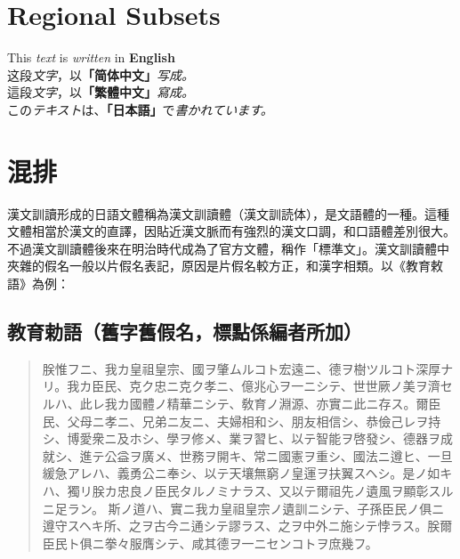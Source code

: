 \documentclass{report}
\begin{document}
\newpage
\section{Regional Subsets}
 {This \textit{text} is \textit{written} in \textbf{English}\\}
 {这段\textit{文字}，以\textbf{「简体中文」}\textit{写成。}\\}
 {\hant 這段\textit{文字}，以\textbf{「繁體中文」}\textit{寫成。}\\}
 {\ja この\textit{テキスト}は、\textbf{「日本語」}で\textit{書かれています。}}
\section{混排}
漢文訓讀形成的日語文體稱為漢文訓讀體{\ja（漢文訓読体）}，是文語體的一種。這種文體相當於漢文的直譯，因貼近漢文脈而有強烈的漢文口調，和口語體差別很大。不過漢文訓讀體後來在明治時代成為了官方文體，稱作「標準文」。漢文訓讀體中夾雜的假名一般以片假名表記，原因是片假名較方正，和漢字相類。以《教育敕語》為例：\\
\subsection{\hant 教育勅語（舊字舊假名，標點係編者所加）}
\begin{quote}
    \ja 朕󠄁惟フニ、我カ皇祖󠄁皇宗、國ヲ肇󠄁ムルコト宏遠󠄁ニ、德ヲ樹ツルコト深厚ナリ。我カ臣民、克ク忠ニ克ク孝ニ、億兆心ヲ一ニシテ、世世厥ノ美ヲ濟セルハ、此レ我カ國體ノ精華ニシテ、敎育ノ淵源、亦實ニ此ニ存ス。爾臣民、父母ニ孝ニ、兄弟ニ友ニ、夫婦󠄁相和シ、朋友相信シ、恭儉己レヲ持シ、博󠄁愛衆ニ及󠄁ホシ、學ヲ修メ、業ヲ習󠄁ヒ、以テ智能ヲ啓󠄁發シ、德器󠄁ヲ成就シ、進󠄁テ公󠄁益󠄁ヲ廣メ、世務ヲ開キ、常ニ國憲ヲ重シ、國法ニ遵󠄁ヒ、一旦緩󠄁急󠄁アレハ、義勇󠄁公󠄁ニ奉シ、以テ天壤無窮󠄁ノ皇運󠄁ヲ扶翼󠄂スヘシ。是ノ如キハ、獨リ朕󠄁カ忠良ノ臣民タルノミナラス、又󠄂以テ爾祖󠄁先ノ遺󠄁風ヲ顯彰スルニ足ラン。
    斯ノ道󠄁ハ、實ニ我カ皇祖󠄁皇宗ノ遺󠄁訓ニシテ、子孫臣民ノ俱ニ遵󠄁守スヘキ所󠄁、之ヲ古今ニ通󠄁シテ謬ラス、之ヲ中外ニ施シテ悖ラス。朕󠄁爾臣民ト俱ニ拳󠄁々服󠄁膺シテ、咸其德ヲ一ニセンコトヲ庶󠄂幾󠄁フ。
\end{quote}
\end{document}
